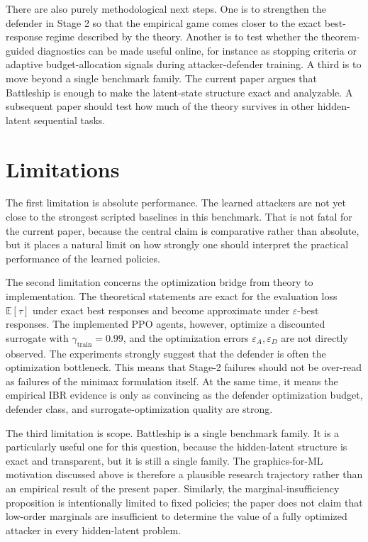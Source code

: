 \documentclass[11pt]{article}
\newcommand{\E}{\mathbb{E}}
\newcommand{\tauT}{\tau}
\newcommand{\gammaTrain}{\gamma_{\mathrm{train}}}
\begin{document}
There are also purely methodological next steps. One is to strengthen the defender in Stage 2 so that the empirical game comes closer to the exact best-response regime described by the theory. Another is to test whether the theorem-guided diagnostics can be made useful online, for instance as stopping criteria or adaptive budget-allocation signals during attacker-defender training. A third is to move beyond a single benchmark family. The current paper argues that Battleship is enough to make the latent-state structure exact and analyzable. A subsequent paper should test how much of the theory survives in other hidden-latent sequential tasks.

\section{Limitations}

The first limitation is absolute performance. The learned attackers are not yet close to the strongest scripted baselines in this benchmark. That is not fatal for the current paper, because the central claim is comparative rather than absolute, but it places a natural limit on how strongly one should interpret the practical performance of the learned policies.

The second limitation concerns the optimization bridge from theory to implementation. The theoretical statements are exact for the evaluation loss $\E[\tauT]$ under exact best responses and become approximate under $\varepsilon$-best responses. The implemented PPO agents, however, optimize a discounted surrogate with $\gammaTrain=0.99$, and the optimization errors $\varepsilon_A,\varepsilon_D$ are not directly observed. The experiments strongly suggest that the defender is often the optimization bottleneck. This means that Stage-2 failures should not be over-read as failures of the minimax formulation itself. At the same time, it means the empirical IBR evidence is only as convincing as the defender optimization budget, defender class, and surrogate-optimization quality are strong.

The third limitation is scope. Battleship is a single benchmark family. It is a particularly useful one for this question, because the hidden-latent structure is exact and transparent, but it is still a single family. The graphics-for-ML motivation discussed above is therefore a plausible research trajectory rather than an empirical result of the present paper. Similarly, the marginal-insufficiency proposition is intentionally limited to fixed policies; the paper does not claim that low-order marginals are insufficient to determine the value of a fully optimized attacker in every hidden-latent problem.
\end{document}
